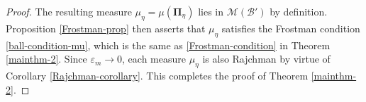 \documentclass[12pt, twoside]{article}
\theoremstyle{definition}
\numberwithin{equation}{section}
\begin{document}
\begin{proof}
%
The resulting measure $\mu_{\eta} = \mu(\pmb{\Pi}_{\eta})$ lies in $\mathscr{M}(\mathscr{B}')$ by definition. Proposition \ref{Frostman-prop} then asserts that $\mu_{\eta}$ satisfies the Frostman condition \eqref{ball-condition-mu}, which is the same as \eqref{Frostman-condition} in Theorem \ref{mainthm-2}. Since $\varepsilon_m \rightarrow 0$,  each measure $\mu_{\eta}$ is also Rajchman by virtue of Corollary \ref{Rajchman-corollary}. This completes the proof of Theorem \ref{mainthm-2}.
\end{proof}
\end{document}
